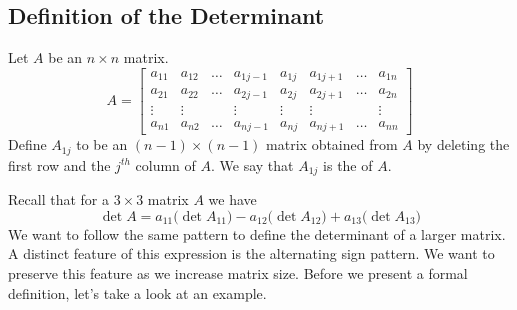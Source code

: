 \documentclass{ximera}
\begin{document}
\subsection*{Definition of the Determinant}
Let $A$ be an $n\times n$ matrix. 
$$A=\begin{bmatrix}a_{11} & a_{12} & \dots & a_{1j-1} & a_{1j} & a_{1j+1} & \dots & a_{1n}  \\
    a_{21} & a_{22} & \dots & a_{2j-1} & a_{2j} & a_{2j+1} & \dots & a_{2n}  \\
   \vdots & \vdots &  & \vdots & \vdots & \vdots &  & \vdots  \\
   a_{n1} & a_{n2} & \dots & a_{nj-1} & a_{nj} & a_{nj+1} & \dots & a_{nn}\end{bmatrix}$$
   Define $A_{1j}$ to be an $(n-1)\times (n-1)$ matrix obtained from $A$ by deleting the first row and the $j^{th}$ column of $A$.  We say that $A_{1j}$ is the  of $A$.
\begin{center}
 \end{center} 
Recall that for a $3\times 3$ matrix $A$ we have
$$\det{A}=a_{11}\big(\det{A_{11}}\big)-a_{12}\big(\det{A_{12}}\big)+a_{13}\big(\det{A_{13}}\big)$$
We want to follow the same pattern  to define the determinant of a larger matrix.  A distinct feature of this expression is the alternating sign pattern.  We want to preserve this feature as we increase matrix size. Before we present a formal definition, let's take a look at an example.
\end{document}
